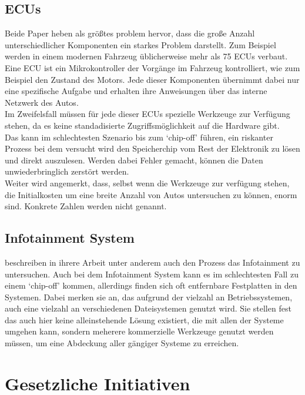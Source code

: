 \documentclass[conference,compsoc,final,a4paper]{IEEEtran}
\begin{document}
\subsection{ECUs}
Beide Paper heben als größtes problem hervor, dass die große Anzahl unterschiedlicher Komponenten ein starkes Problem darstellt.
Zum Beispiel werden in einem modernen Fahrzeug üblicherweise mehr als 75 \ac{ECU}s verbaut.~\cite{Stopka_2019}
Eine \ac{ECU} ist ein Mikrokontroller der Vorgänge im Fahrzeug kontrolliert, wie zum Beispiel den Zustand des Motors. Jede dieser
Komponenten übernimmt dabei nur eine spezifische Aufgabe und erhalten ihre Anweisungen über das interne Netzwerk des Autos.\\
Im Zweifelsfall müssen für jede dieser \ac{ECU}s spezielle Werkzeuge zur Verfügung stehen, da es keine standadisierte Zugriffsmöglichkeit
auf die Hardware gibt.\\
Das kann im schlechtesten Szenario bis zum `chip-off' führen, ein riskanter Prozess bei dem versucht wird den Speicherchip vom Rest der Elektronik
zu lösen und direkt auszulesen.
Werden dabei Fehler gemacht, können die Daten unwiederbringlich zerstört werden.\\
Weiter wird angemerkt, dass, selbst wenn die Werkzeuge zur verfügung stehen, die Initialkosten um eine breite Anzahl von Autos untersuchen zu können,
enorm sind. Konkrete Zahlen werden nicht genannt.\\

\subsection{Infotainment System}
 beschreiben in ihrere Arbeit unter anderem auch den Prozess das Infotainment zu untersuchen.
Auch bei dem Infotainment System kann es im schlechtesten Fall zu einem `chip-off' kommen, allerdings finden sich oft entfernbare Festplatten in den Systemen.
Dabei merken sie an, das aufgrund der vielzahl an Betriebssystemen, auch eine vielzahl an verschiedenen Dateisystemen genutzt wird.
Sie stellen fest das auch hier keine alleinstehende Lösung existiert, die mit allen der Systeme umgehen kann, sondern meherere
kommerzielle Werkzeuge genutzt werden müssen, um eine Abdeckung aller gängiger Systeme zu erreichen.

\section{Gesetzliche Initiativen}
\end{document}
